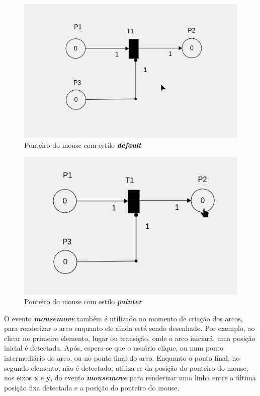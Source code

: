 \documentclass[
	12pt,				%
	openright,			%
	oneside,			%
	a4paper,			%
	english,			%
	brazil				%
	]{abntex2}
\begin{document}
\begin{figure}[ht] 
	\centering
	\includegraphics[scale=0.4]{figuras/mouse_estilo_default.png}
	\caption[Mouse estilo default]{Ponteiro do mouse com estilo \textbf{\textit{default}}}
	\label{fig:mouse_estilo_default}
\end{figure}
\FloatBarrier

\begin{figure}[ht] 
	\centering
	\includegraphics[scale=0.4]{figuras/mouse_estilo_pointer.png}
	\caption[Mouse estilo default]{Ponteiro do mouse com estilo \textbf{\textit{pointer}}}
	\label{fig:mouse_estilo_pointer}
\end{figure}
\FloatBarrier

O evento \textbf{\textit{mousemove}} também é utilizado no momento de criação dos arcos, para renderizar o arco enquanto ele ainda está sendo desenhado. Por exemplo, ao clicar no primeiro elemento, lugar ou transição, onde o arco iniciará, uma posição inicial é detectada. Após, espera-se que o usuário clique, ou num ponto intermediário do arco, ou no ponto final do arco. Enquanto o ponto final, no segundo elemento, não é detectado, utiliza-se da posição do ponteiro do mouse, nos eixos \textbf{x} e \textbf{y}, do evento \textbf{\textit{mousemove}} para renderizar uma linha entre a última posição fixa detectada e a posição do ponteiro do mouse.
\end{document}
